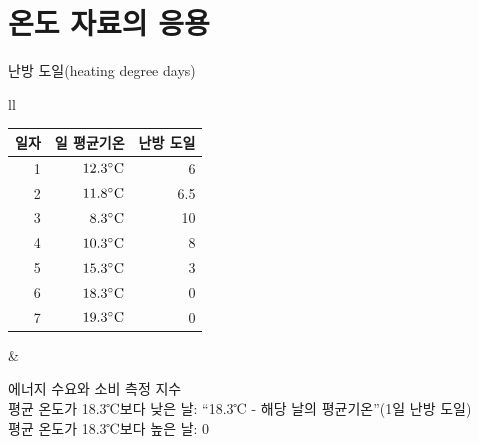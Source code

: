 \section{온도 자료의 응용}



\begin{frame}[t]{난방 도일(heating degree days)}
	\begin{tabular}{ll}
		\begin{minipage}[t]{0.50\textwidth}
			{\scriptsize
			\begin{table}[]
					\begin{tabular}{r|r|r}
						\hline
						일자 & 일 평균기온  & 난방 도일 \\						\hline
						1  & $12.3 \rm{{^\circ}C}$ & 6    \\						\hline
						2  & $11.8 \rm{{^\circ}C}$ & 6.5  \\						\hline
						3  & $8.3 \rm{{^\circ}C}$  & 10   \\						\hline
						4  & $10.3 \rm{{^\circ}C}$ & 8    \\						\hline
						5  & $15.3 \rm{{^\circ}C}$ & 3    \\						\hline
						6  & $18.3 \rm{{^\circ}C}$ & 0    \\						\hline
						7  & $19.3 \rm{{^\circ}C}$ & 0   \\					\hline
					\end{tabular}%
			\end{table}
		}
		\end{minipage}	
		&
		\begin{minipage}[t]{0.45\textwidth}
			에너지 수요와 소비 측정 지수\\
			평균 온도가 18.3℃보다 낮은 날: “18.3℃ - 해당 날의 평균기온”(1일 난방 도일)\\
			평균 온도가 18.3℃보다 높은 날: 0
		\end{minipage}
	\end{tabular}
\end{frame}



